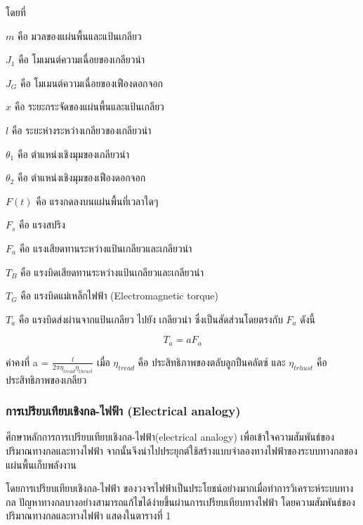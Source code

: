 \documentclass[11pt,a4paper]{article}
\begin{document}
โดยที่

$m$ คือ มวลของแผ่นพื้นและแป้นเกลียว

$J_{1}$ คือ โมเมนต์ความเฉื่อยของเกลียวนำ

$J_{G}$ คือ โมเมนต์ความเฉื่อยของเฟืองดอกจอก

$x$ คือ ระยะกระจัดของแผ่นพื้นและแป้นเกลียว

$l$ คือ ระยะห่างระหว่างเกลียวของเกลียวนำ

$\theta_{1}$  คือ ตำแหน่งเชิงมุมของเกลียวนำ

$\theta_{2}$  คือ ตำแหน่งเชิงมุมของเฟืองดอกจอก

$F(t)$  คือ แรงกดลงบนแผ่นพื้นที่เวลาใดๆ

$F_{s}$   คือ แรงสปริง

$F_{a}$   คือ แรงเสียดทานระหว่างแป้นเกลียวและเกลียวนำ

$T_{B}$   คือ แรงบิดเสียดทานระหว่างแป้นเกลียวและเกลียวนำ

$T_{G}$   คือ แรงบิดแม่เหล็กไฟฟ้า (Electromagnetic torque)

$T_{a}$   คือ แรงบิดส่งผ่านจากแป้นเกลียว ไปยัง เกลียวนำ ซึ่งเป็นสัดส่วนโดยตรงกับ $F_{a}$ ดังนี้

\begin{equation}
    T_{a} = aF_{a}
\end{equation}

ค่าคงที่ a = $\frac{l}{2\pi \eta_{tread} \eta_{thrust}}$ เมื่อ $\eta_{tread}$ คือ ประสิทธิภาพของตลับลูกปืนคลัตซ์ และ $\eta_{trhust}$ คือ ประสิทธิภาพของเกลียว

\subsubsection{การเปรียบเทียบเชิงกล-ไฟฟ้า (Electrical analogy)}
ศึกษาหลักการการเปรียบเทียบเชิงกล-ไฟฟ้า(electrical analogy) \cite{ElecDrive} เพื่อเข้าใจความสัมพันธ์ของปริมาณทางกลและทางไฟฟ้า จากนั้นจึงนำไปประยุกต์ใช้สร้างแบบจำลองทางไฟฟ้าของระบบทางกลของแผ่นพื้นเก็บพลังงาน

โดยการเปรียบเทียบเชิงกล-ไฟฟ้า ของวงจรไฟฟ้าเป็นประโยชน์อย่างมากเมื่อทำการวิเคราะห์ระบบทางกล ปัญหาทางกลบางอย่างสามารถแก้ไขได้ง่ายขึ้นผ่านการเปรียบเทียบทางไฟฟ้า โดยความสัมพันธ์ของปริมาณทางกลและทางไฟฟ้า แสดงในตารางที่ 1

\newpage
\end{document}
